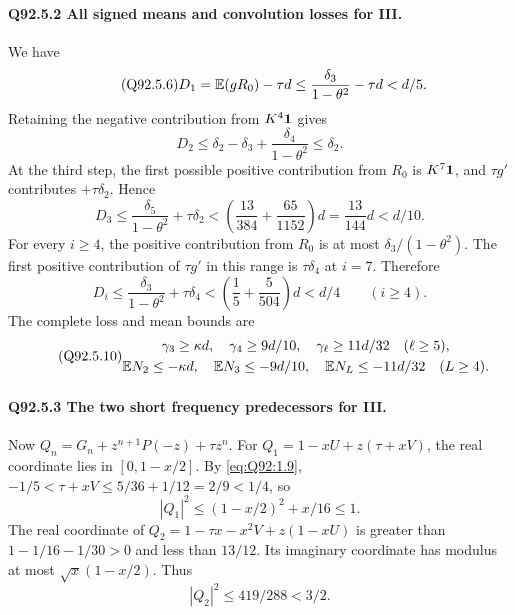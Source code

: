 \paragraph{Q92.5.2 All signed means and convolution losses for III.}
We have
\begin{equation}\tag{Q92.5.6}\label{eq:Q92:5.6}
D_1=\mathbb E(gR_0)-\tau d\le\frac{\delta_3}{1-\theta^2}-\tau d<d/5.
\end{equation}
Retaining the negative contribution from \(K^4\mathbf1\) gives
\begin{equation}\tag{Q92.5.7}\label{eq:Q92:5.7}
D_2\le\delta_2-\delta_3+\frac{\delta_4}{1-\theta^2}\le\delta_2.
\end{equation}
At the third step, the first possible positive contribution from \(R_0\)
is \(K^7\mathbf1\), and \(\tau g'\) contributes \(+\tau\delta_2\). Hence
\begin{equation}\tag{Q92.5.8}\label{eq:Q92:5.8}
D_3\le\frac{\delta_5}{1-\theta^2}+\tau\delta_2
<\left(\frac{13}{384}+\frac{65}{1152}\right)d
=\frac{13}{144}d<d/10.
\end{equation}
For every \(i\ge\allowbreak 4\), the positive contribution from \(R_0\) is at most
\(\delta_3/(1-\theta^2)\). The first positive contribution of
\(\tau g'\) in this range is \(\tau\delta_4\) at \(i=\allowbreak 7\). Therefore
\begin{equation}\tag{Q92.5.9}\label{eq:Q92:5.9}
D_i\le\frac{\delta_3}{1-\theta^2}+\tau\delta_4
<\left(\frac15+\frac5{504}\right)d<d/4\qquad(i\ge4).
\end{equation}
The complete loss and mean bounds are
\begin{equation}\tag{Q92.5.10}\label{eq:Q92:5.10}
\begin{gathered}
\gamma_3\ge\kappa d,\quad\gamma_4\ge9d/10,\quad
\gamma_\ell\ge11d/32\quad(\ell\ge5),\\
\mathbb E N_2\le-\kappa d,\quad\mathbb E N_3\le-9d/10,\quad
\mathbb E N_L\le-11d/32\quad(L\ge4).
\end{gathered}
\end{equation}

\paragraph{Q92.5.3 The two short frequency predecessors for III.}
Now \(Q_n=\allowbreak G_n+z^{n+1}P(-z)+\tau z^n\).
For \(Q_1=\allowbreak 1-xU+z(\tau+xV)\), the real coordinate lies in
\([0,\allowbreak 1-x/2]\). By \eqref{eq:Q92:1.9},
\(-1/5<\allowbreak \tau+xV\le\allowbreak 5/36+1/12=\allowbreak 2/9<\allowbreak 1/4\), so
\begin{equation}\tag{Q92.5.11}\label{eq:Q92:5.11}
|Q_1|^2\le(1-x/2)^2+x/16\le1.
\end{equation}
The real coordinate of \(Q_2=\allowbreak 1-\tau x-x^2V+z(1-xU)\) is greater than
\(1-1/16-1/30>\allowbreak 0\) and less than \(13/12\). Its imaginary coordinate
has modulus at most \(\sqrt x(1-x/2)\). Thus
\begin{equation}\tag{Q92.5.12}\label{eq:Q92:5.12}
|Q_2|^2\le419/288<3/2.
\end{equation}

